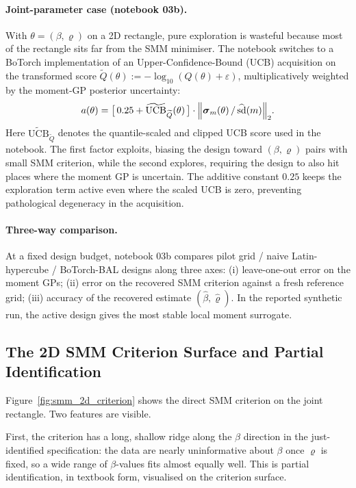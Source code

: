 \documentclass[11pt,a4paper]{report}
\begin{document}
\paragraph{Joint-parameter case (notebook 03b).}  With $\theta=(\beta,\varrho)$ on a 2D rectangle, pure exploration is wasteful because most of the rectangle sits far from the SMM minimiser.  The notebook switches to a BoTorch implementation of an Upper-Confidence-Bound (UCB) acquisition on the transformed score $\widetilde Q(\theta) := -\log_{10}(Q(\theta)+\varepsilon)$, multiplicatively weighted by the moment-GP posterior uncertainty:
\begin{equation}
a(\theta)
=
\bigl[\,0.25+\widetilde{\mathrm{UCB}}_{\widetilde Q}(\theta)\,\bigr]
\cdot
\Bigl\|\boldsymbol\sigma_m(\theta)\,/\,\widehat{\mathrm{sd}}(m)\Bigr\|_2.
\label{eq:smm_acquisition}
\end{equation}
Here $\widetilde{\mathrm{UCB}}_{\widetilde Q}$ denotes the quantile-scaled and clipped UCB score used in the notebook.  The first factor exploits, biasing the design toward $(\beta,\varrho)$ pairs with small SMM criterion, while the second explores, requiring the design to also hit places where the moment GP is uncertain.  The additive constant $0.25$ keeps the exploration term active even where the scaled UCB is zero, preventing pathological degeneracy in the acquisition.

\paragraph{Three-way comparison.}  At a fixed design budget, notebook 03b compares pilot grid / naive Latin-hypercube / BoTorch-BAL designs along three axes: (i) leave-one-out error on the moment GPs; (ii) error on the recovered SMM criterion against a fresh reference grid; (iii) accuracy of the recovered estimate $(\hat\beta,\hat\varrho)$.  In the reported synthetic run, the active design gives the most stable local moment surrogate.

\subsection{The 2D SMM Criterion Surface and Partial Identification}

Figure~\ref{fig:smm_2d_criterion} shows the direct SMM criterion on the joint rectangle.  Two features are visible.

First, the criterion has a long, shallow ridge along the $\beta$ direction in the just-identified specification: the data are nearly uninformative about $\beta$ once $\varrho$ is fixed, so a wide range of $\beta$-values fits almost equally well.  This is partial identification, in textbook form, visualised on the criterion surface.
\end{document}
